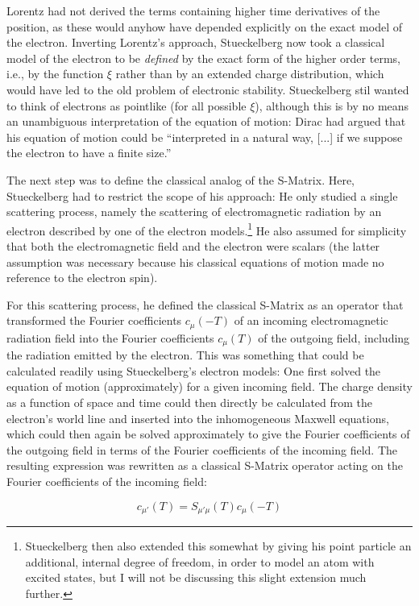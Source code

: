 \documentclass[12pt,a4paper]{article}
\begin{document}
Lorentz had not derived the terms containing higher time derivatives of the position, as these would anyhow have depended explicitly on the exact model of the electron. Inverting Lorentz's approach, Stueckelberg now took a classical model of the electron to be \emph{defined} by the exact form of the higher order terms, i.e., by the function $\xi$ rather than by an extended charge distribution, which would have led to the old problem of electronic stability. Stueckelberg stil wanted to think of electrons as pointlike (for all possible $\xi$), although this is by no means an unambiguous interpretation of the equation of motion: Dirac had argued that his equation of motion could be ``interpreted in a natural way, [...] if we suppose the electron to have a finite size.''

The next step was to define the classical analog of the S-Matrix. Here, Stueckelberg had to restrict the scope of his approach: He only studied a single scattering process, namely the scattering of electromagnetic radiation by an electron described by one of the electron models.\footnote{Stueckelberg then also extended this somewhat by giving his point particle an additional, internal degree of freedom, in order to model an atom with excited states, but I will not be discussing this slight extension much further.} He also assumed for simplicity that both the electromagnetic field and the electron were scalars (the latter assumption was necessary because his classical equations of motion made no reference to the electron spin).

For this scattering process, he defined the classical S-Matrix as an operator that transformed the Fourier coefficients $c_{\mu} (-T)$ of an incoming electromagnetic radiation field into the Fourier coefficients $c_{\mu} (T)$ of the outgoing field, including the radiation emitted by the electron. This was something that could be calculated readily using Stueckelberg's electron models: One first solved the equation of motion (approximately) for a given incoming field. The charge density as a function of space and time could then directly be calculated from the electron's world line and inserted into the inhomogeneous Maxwell equations, which could then again be solved approximately to give the Fourier coefficients of the outgoing field in terms of the Fourier coefficients of the incoming field. The resulting expression was rewritten as a classical S-Matrix operator acting on the Fourier coefficients of the incoming field:

\begin{equation}
c_{\mu'} (T) = S_{\mu' \mu}(T) c_{\mu}(-T)
\end{equation}
\end{document}
